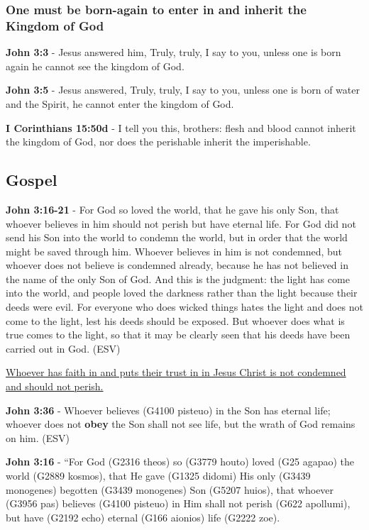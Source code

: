 \documentclass[11pt]{article}
\begin{document}
\subsubsection{One must be born-again to enter in and inherit the Kingdom of God}
\label{sec:orgdba98a4}
\textbf{John 3:3} - Jesus answered him, Truly, truly, I say to you, unless one is born again he cannot see the kingdom of God.

\textbf{John 3:5} - Jesus answered, Truly, truly, I say to you, unless one is born of water and the Spirit, he cannot enter the kingdom of God.

\textbf{I Corinthians 15:50d} - I tell you this, brothers: flesh and blood cannot inherit the kingdom of God, nor does the perishable inherit the imperishable.

\subsection{Gospel}
\label{sec:org96604b8}
\textbf{John 3:16-21} -  For God so loved the world, that he gave his only Son, that whoever believes in him should not perish but have eternal life.  For God did not send his Son into the world to condemn the world, but in order that the world might be saved through him.  Whoever believes in him is not condemned, but whoever does not believe is condemned already, because he has not believed in the name of the only Son of God.  And this is the judgment: the light has come into the world, and people loved the darkness rather than the light because their deeds were evil.  For everyone who does wicked things hates the light and does not come to the light, lest his deeds should be exposed.  But whoever does what is true comes to the light, so that it may be clearly seen that his deeds have been carried out in God.  (ESV)

\uline{Whoever has faith in and puts their trust in in Jesus Christ is not condemned and should not perish.}

\textbf{John 3:36} - Whoever believes (G4100 pisteuo) in the Son has eternal life; whoever does not \textbf{obey} the Son shall not see life, but the wrath of God remains on him. (ESV)

\textbf{John 3:16} - “For God (G2316 theos) so (G3779 houto) loved (G25 agapao) the world (G2889 kosmos), that He gave (G1325 didomi) His only (G3439 monogenes) begotten (G3439 monogenes) Son (G5207 huios), that whoever (G3956 pas) believes (G4100 pisteuo) in Him shall not perish (G622 apollumi), but have (G2192 echo) eternal (G166 aionios) life (G2222 zoe).
\end{document}
